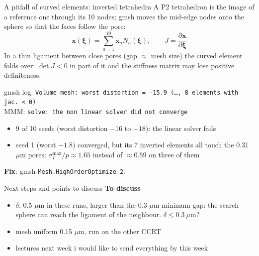 \documentclass[10pt,aspectratio=169]{beamer}
\newcommand{\code}[1]{\texttt{#1}}
\begin{document}
\begin{frame}{A pitfall of curved elements: inverted tetrahedra}
\small
A P2 tetrahedron is the image of a reference one through its 10 nodes; gmsh moves the mid-edge nodes onto the sphere so
that the faces follow the pore:
\[
\mathbf x(\boldsymbol\xi)=\sum_{a=1}^{10}\mathbf x_a N_a(\boldsymbol\xi),\qquad
J=\frac{\partial\mathbf x}{\partial\boldsymbol\xi}
\]
In a thin ligament between close pores (gap $\approx$ mesh size) the curved element folds over: $\det J<0$ in part of it
and the stiffness matrix may lose positive definiteness.
\vspace{4pt}

gmsh log: {\footnotesize\code{Volume mesh: worst distortion = -15.9 (\dots, 8 elements with jac. < 0)}}\\
MMM: {\footnotesize\code{solve: the non linear solver did not converge}}
\begin{itemize}
\item 9 of 10 seeds (worst distortion $-16$ to $-18$): the linear solver fails
\item seed 1 (worst $-1.8$) converged, but its 7 inverted elements all touch the 0.31 $\mu$m pores:
      $\sigma_I^{\max}/p\approx1.65$ instead of $\approx0.59$ on three of them
\end{itemize}
\textbf{Fix}: gmsh \code{Mesh.HighOrderOptimize 2}.
\end{frame}

\begin{frame}{Next steps and points to discuss}
\textbf{To discuss}
\begin{itemize}\small
\item \textbf{$\delta$}: 0.5 $\mu$m in these runs, larger than the 0.3 $\mu$m minimum gap: the search sphere can reach the
      ligament of the neighbour. $\delta\le0.3\ \mu$m?
\item mesh uniform 0.15 $\mu$m, run on the other CCRT
\item lectures next week i would like to send everything by this week

\end{itemize}
\end{frame}
\end{document}
